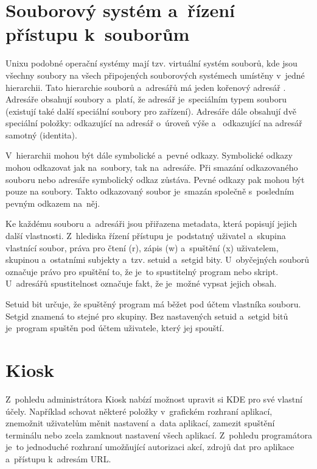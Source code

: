 \section{Souborový systém a~řízení přístupu k~souborům}
Unixu podobné operační systémy mají tzv. virtuální systém souborů, kde jsou všechny soubory na všech připojených souborových systémech umístěny v~jedné hierarchii. Tato hierarchie souborů a~adresářů má jeden kořenový adresář \uv{/}. Adresáře obsahují soubory a~platí, že adresář je~speciálním typem souboru (existují také další speciální soubory pro zařízení). Adresáře dále obsahují dvě speciální položky:  odkazující na adresář o~úroveň výše a~ odkazující na adresář samotný (identita).

V~hierarchii mohou být dále symbolické a~pevné odkazy. Symbolické odkazy mohou odkazovat jak na~soubory, tak na~adresáře. Při smazání odkazovaného souboru nebo adresáře symbolický odkaz zůstáva. Pevné odkazy pak mohou být pouze na soubory. Takto odkazovaný soubor je~smazán společně s~posledním pevným odkazem na~něj.

Ke každému souboru a~adresáři jsou přiřazena metadata, která popisují jejich další vlastnosti. Z~hlediska řízení přístupu je~podstatný uživatel a~skupina vlastnící soubor, práva pro čtení (r), zápis (w) a~spuštění (x) uživatelem, skupinou a~ostatními subjekty a~tzv. setuid a~setgid bity. U~obyčejných souborů označuje právo pro spuštění to, že je~to spustitelný program nebo skript. U~adresářů spustitelnost označuje fakt, že je~možné vypsat jejich obsah.\cite{secureProg, OSP}

Setuid bit určuje, že spuštěný program má běžet pod účtem vlastníka souboru. Setgid znamená to stejné pro skupiny. Bez nastavených setuid a~setgid bitů je~program spuštěn pod účtem uživatele, který jej spouští.\cite{secureProg}


\section{Kiosk}
Z~pohledu administrátora Kiosk nabízí možnost upravit si KDE pro své vlastní účely. Například schovat některé položky v~grafickém rozhraní aplikací, znemožnit uživatelům měnit nastavení a~data aplikací, zamezit spuštění terminálu nebo zcela zamknout nastavení všech aplikací. Z~pohledu programátora je~to jednoduché rozhraní umožňující autorizaci akcí, zdrojů dat pro aplikace a~přístupu k~adresám URL.

